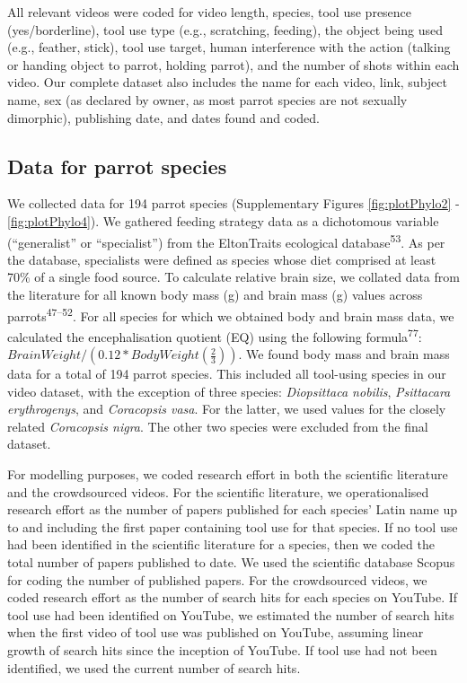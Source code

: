 \documentclass[
  man,floatsintext]{apa6}
\begin{document}
All relevant videos were coded for video length, species, tool use presence (yes/borderline), tool use type (e.g., scratching, feeding), the object being used (e.g., feather, stick), tool use target, human interference with the action (talking or handing object to parrot, holding parrot), and the number of shots within each video. Our complete dataset also includes the name for each video, link, subject name, sex (as declared by owner, as most parrot species are not sexually dimorphic), publishing date, and dates found and coded.

\hypertarget{data-for-parrot-species}{%
\subsection{Data for parrot species}\label{data-for-parrot-species}}

We collected data for 194 parrot species (Supplementary Figures \ref{fig:plotPhylo2} - \ref{fig:plotPhylo4}). We gathered feeding strategy data as a dichotomous variable (``generalist'' or ``specialist'') from the EltonTraits ecological database\textsuperscript{53}. As per the database, specialists were defined as species whose diet comprised at least 70\% of a single food source. To calculate relative brain size, we collated data from the literature for all known body mass (g) and brain mass (g) values across parrots\textsuperscript{47--52}. For all species for which we obtained body and brain mass data, we calculated the encephalisation quotient (EQ) using the following formula\textsuperscript{77}: \(BrainWeight / (0.12 * BodyWeight(\frac{2}{3}))\). We found body mass and brain mass data for a total of 194 parrot species. This included all tool-using species in our video dataset, with the exception of three species: \emph{Diopsittaca nobilis}, \emph{Psittacara erythrogenys}, and \emph{Coracopsis vasa}. For the latter, we used values for the closely related \emph{Coracopsis nigra}. The other two species were excluded from the final dataset.

For modelling purposes, we coded research effort in both the scientific literature and the crowdsourced videos. For the scientific literature, we operationalised research effort as the number of papers published for each species' Latin name up to and including the first paper containing tool use for that species. If no tool use had been identified in the scientific literature for a species, then we coded the total number of papers published to date. We used the scientific database Scopus for coding the number of published papers. For the crowdsourced videos, we coded research effort as the number of search hits for each species on YouTube. If tool use had been identified on YouTube, we estimated the number of search hits when the first video of tool use was published on YouTube, assuming linear growth of search hits since the inception of YouTube. If tool use had not been identified, we used the current number of search hits.
\end{document}
